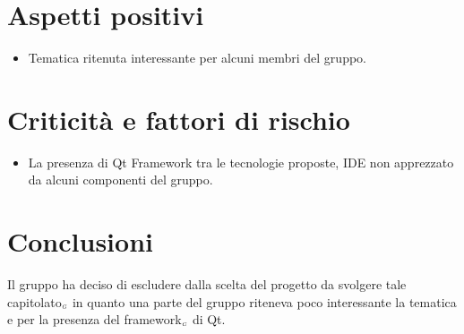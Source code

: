 \section{Aspetti positivi} \label{C7AspettiPositivi}
\begin{itemize}
	\item Tematica ritenuta interessante per alcuni membri del gruppo.
\end{itemize}
\section{Criticità e fattori di rischio} \label{C7CriticitàEFattoriDiRischio}
\begin{itemize}
	\item La presenza di Qt Framework tra le tecnologie proposte, IDE non apprezzato da alcuni componenti del gruppo.
\end{itemize}
\section{Conclusioni} \label{C7Conclusioni}
Il gruppo ha deciso di escludere dalla scelta del progetto da svolgere tale capitolato$_{\scaleto{G}{3pt}}$ in quanto una parte del gruppo riteneva poco interessante la tematica e per la presenza  del framework$_{\scaleto{G}{3pt}}$ di Qt.